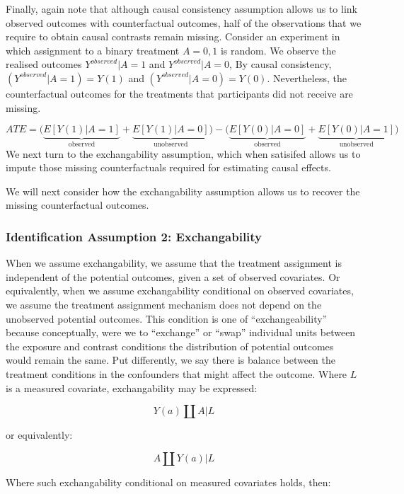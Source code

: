 \documentclass[
  singlecolumn]{report}
\begin{document}
Finally, again note that although causal consistency assumption allows
us to link observed outcomes with counterfactual outcomes, half of the
observations that we require to obtain causal contrasts remain missing.
Consider an experiment in which assignment to a binary treatment
\(A = {0,1}\) is random. We observe the realised outcomes
\(Y^{observed}|A = 1\) and \(Y^{observed}|A = 0\), By causal
consistency, \((Y^{observed}|A = 1) = Y(1)\) and
\((Y^{observed}|A = 0) = Y(0)\). Nevertheless, the counterfactual
outcomes for the treatments that participants did not receive are
missing.

\[
ATE = \bigg(\underbrace{E[Y(1)|A = 1]}_\text{observed} + \underbrace{E[Y(1)|A = 0]}_\text{unobserved}\bigg) - \bigg(\underbrace{E[Y(0)|A = 0]}_\text{observed}  + \underbrace{E[Y(0)|A = 1]}_\text{unobserved}\bigg)
\] We next turn to the exchangability assumption, which when satisifed
allows us to impute those missing counterfactuals required for
estimating causal effects.

We will next consider how the exchangability assumption allows us to
recover the missing counterfactual outcomes.

\hypertarget{identification-assumption-2-exchangability}{%
\subsubsection{Identification Assumption 2:
Exchangability}\label{identification-assumption-2-exchangability}}

When we assume exchangability, we assume that the treatment assignment
is independent of the potential outcomes, given a set of observed
covariates. Or equivalently, when we assume exchangability conditional
on observed covariates, we assume the treatment assignment mechanism
does not depend on the unobserved potential outcomes. This condition is
one of ``exchangeability'' because conceptually, were we to ``exchange''
or ``swap'' individual units between the exposure and contrast
conditions the distribution of potential outcomes would remain the same.
Put differently, we say there is balance between the treatment
conditions in the confounders that might affect the outcome. Where \(L\)
is a measured covariate, exchangability may be expressed:

\[Y(a)\coprod  A|L\]

or equivalently:

\[A \coprod  Y(a)|L\]

Where such exchangability conditional on measured covariates holds,
then:
\end{document}
